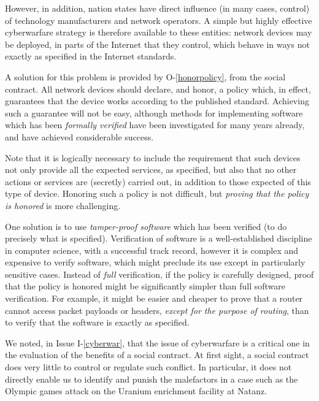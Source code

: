 However, in addition, nation states have direct influence (in many cases, control)
of technology manufacturers and network operators. A simple but highly effective
cyberwarfare strategy is therefore available to these entities: network devices
may be deployed, in parts of the Internet that they control, which behave in
ways not exactly as specified in the Internet standards.

A solution for this problem is provided by O-\ref{honorpolicy}, from the social
contract. All network devices should declare, and honor, a policy which, in effect,
guarantees that the device works according to the published standard.
Achieving such a guarantee will not be easy, although methods for implementing
software which has been {\em formally verified} have been investigated for
many years already, and have achieved considerable success.

\iffalse
Note that it is logically necessary to include the requirement that such devices
not only provide all the expected services, as specified, but also that
no other actions or services are (secretly) carried out, in addition to those
expected of this type of device. Honoring such a policy is not difficult, but
{\em proving that the policy is honored} is more challenging. 

One solution is to use {\em tamper-proof software} which has been verified
(to do precisely what is specified). Verification of software is a
well-established discipline in computer science, with a successful track
record, however it is complex and expensive to verify software, which
might preclude its use except in particularly sensitive cases. Instead of
{\em full} verification, if the policy is carefully designed, proof that
the policy is honored might be significantly simpler than full software
verification. For example, it might be easier and cheaper to prove that
a router cannot access packet payloads or headers, {\em except for the purpose
of routing}, than to verify that the software is exactly as specified.

We noted, in Issue I-\ref{cyberwar}, that the issue of cyberwarfare is a critical
one in the evaluation of the benefits of a social contract. At first sight,
a social contract does very little to control or regulate such conflict.
In particular, it does not directly enable us to identify and punish the
malefactors in a case such as the Olympic games attack on the Uranium enrichment
facility at Natanz. 

